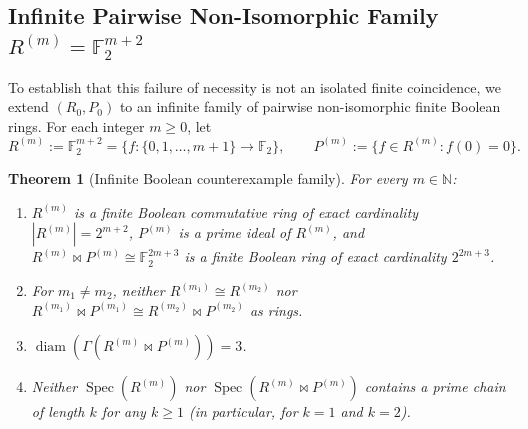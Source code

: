 \documentclass[11pt]{article}
\newtheorem{theorem}{Theorem}[section]
\theoremstyle{definition}
\newcommand{\Spec}{\operatorname{Spec}}
\newcommand{\diam}{\operatorname{diam}}
\newcommand{\FF}{\mathbb{F}}
\newcommand{\NN}{\mathbb{N}}
\begin{document}
\subsection{Infinite Pairwise Non-Isomorphic Family \texorpdfstring{$R^{(m)} = \FF_2^{m+2}$}{R(m) = F2\^{}(m+2)}}

To establish that this failure of necessity is not an isolated finite coincidence, we
extend $(R_0, P_0)$ to an infinite family of pairwise non-isomorphic finite Boolean rings.
For each integer $m \ge 0$, let
\[
  R^{(m)} := \FF_2^{m+2} = \{f : \{0, 1, \dots, m+1\} \to \FF_2\}, \qquad
  P^{(m)} := \{f \in R^{(m)} : f(0) = 0\}.
\]

\begin{theorem}[Infinite Boolean counterexample family]\label{thm:boolean-family}
For every $m \in \NN$:
\begin{enumerate}
  \item $R^{(m)}$ is a finite Boolean commutative ring of exact cardinality $|R^{(m)}| = 2^{m+2}$,
  $P^{(m)}$ is a prime ideal of $R^{(m)}$, and $R^{(m)} \bowtie P^{(m)} \cong \FF_2^{2m+3}$
  is a finite Boolean ring of exact cardinality $2^{2m+3}$.
  \item For $m_1 \neq m_2$, neither $R^{(m_1)} \cong R^{(m_2)}$ nor
  $R^{(m_1)} \bowtie P^{(m_1)} \cong R^{(m_2)} \bowtie P^{(m_2)}$ as rings.
  \item $\diam(\Gamma(R^{(m)} \bowtie P^{(m)})) = 3$.
  \item Neither $\Spec(R^{(m)})$ nor $\Spec(R^{(m)} \bowtie P^{(m)})$ contains a prime
  chain of length $k$ for any $k \ge 1$ (in particular, for $k = 1$ and $k = 2$).
\end{enumerate}
\end{theorem}
\end{document}
